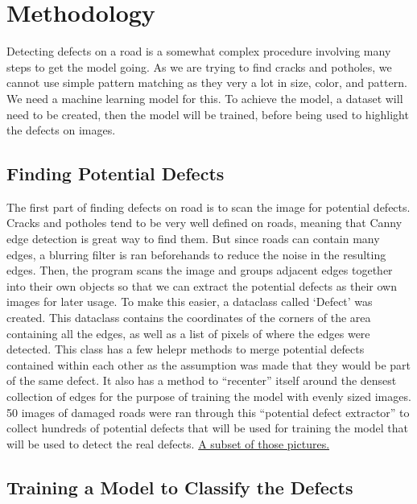 \documentclass[12pt, letterpaper, twoside]{article}
\begin{document}
\section{Methodology}\label{sec:meth}

Detecting defects on a road is a somewhat complex procedure involving many steps to get the model going. 
As we are trying to find cracks and potholes, we cannot use simple pattern matching as they very a lot in size, color, and pattern.
We need a machine learning model for this.
To achieve the model, a dataset will need to be created, then the model will be trained, before being used to highlight the defects on images.

\subsection{Finding Potential Defects}\label{sec:meth:1}

The first part of finding defects on road is to scan the image for potential defects. 
Cracks and potholes tend to be very well defined on roads, meaning that Canny edge detection is great way to find them.
But since roads can contain many edges, a blurring filter is ran beforehands to reduce the noise in the resulting edges.
Then, the program scans the image and groups adjacent edges together into their own objects so that we can extract the potential defects as their own images for later usage.
To make this easier, a dataclass called `Defect' was created.
This dataclass contains the coordinates of the corners of the area containing all the edges, as well as a list of pixels of where the edges were detected.
This class has a few helepr methods to merge potential defects contained within each other as the assumption was made that they would be part of the same defect.
It also has a method to ``recenter'' itself around the densest collection of edges for the purpose of training the model with evenly sized images.
50 images of damaged roads were ran through this ``potential defect extractor'' to collect hundreds of potential defects that will be used for training the model that will be used to detect the real defects.
\hyperref[app:train_data]{A subset of those pictures.}

\subsection{Training a Model to Classify the Defects}
\end{document}
